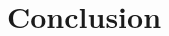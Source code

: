 \documentclass[12pt]{article}
\begin{document}




\section*{\fontsize{12}{12}\selectfont \large Conclusion}






\begin{thebibliography}{2}


\end{thebibliography}




\end{document}
